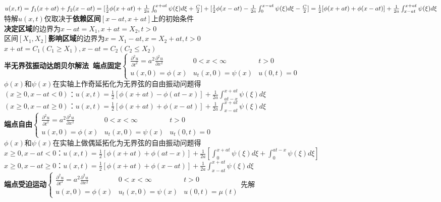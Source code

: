 \documentclass[10pt,a4paper]{article}
\begin{document}
\begin{multicols}{2}
$u(x,t)=f_1(x+at)+f_2(x-at)\\=[\frac{1}{2}\phi(x+at)+\frac{1}{2a}\int_0^{x+at}\psi(\xi)d\xi+\frac{C}{2}]+[\frac{1}{2}\phi(x-at)-\frac{1}{2a}\int_0^{x-at}\psi(\xi)d\xi-\frac{C}{2}]\\=\frac{1}{2}[\phi(x+at)+\phi(x-at)]+\frac{1}{2a}\int_{x-at}^{x+at}\psi(\xi)d\xi$\\
特解$u(x,t)$仅取决于\textbf{依赖区间}$[x-at,x+at]$上的初始条件\\
\textbf{决定区域}的边界为$x-at=X_1,x+at=X_2,t>0$\\
区间$[X_1,X_2]$\textbf{影响区域}的边界为$x=X_1-at,x=X_2+at,t>0$\\
\indent{}$x+at=C_1(C_1\geq X_1),x-at=C_2(C_2\leq X_2)$\scriptsize\\
\textbf{半无界弦振动达朗贝尔解法~端点固定}$\left\{\begin{array}{lll}\frac{\partial^2u}{\partial t^2}=a^2\frac{\partial^2u}{\partial x^2}&0<x<\infty&t>0\\u(x,0)=\phi(x)&u_t(x,0)=\psi(x)&u(0,t)=0\end{array}\right.$\\
$\phi(x)$和$\psi(x)$在实轴上作奇延拓化为无界弦的自由振动问题得\\
$(x\geq0,x-at<0)$：$u(x,t)=\frac{1}{2}[\phi(x+at)-\phi(at-x)]+\frac{1}{2a}\int_{at-x}^{x+at}\psi(\xi)d\xi$\\
$(x\geq0,x-at\geq0)$：$u(x,t)=\frac{1}{2}[\phi(x+at)+\phi(x-at)]+\frac{1}{2a}\int_{x-at}^{x+at}\psi(\xi)d\xi$\\
\indent\textbf{端点自由}$\left\{\begin{array}{lll}\frac{\partial^2u}{\partial t^2}=a^2\frac{\partial^2u}{\partial x^2}&0<x<\infty&t>0\\u(x,0)=\phi(x)&u_t(x,0)=\psi(x)&u_t(0,t)=0\end{array}\right.$\\
$\phi(x)$和$\psi(x)$在实轴上做偶延拓化为无界弦的自由振动问题得\\
$x\geq0,x-at<0$：$u(x,t)=\frac{1}{2}[\phi(x+at)+\phi(at-x)]+\frac{1}{2a}[\int_0^{x+at}\psi(\xi)d\xi+\int_0^{at-x}\psi(\xi)d\xi]$\\
$x\geq0,x-at\geq0$：$u(x,t)=\frac{1}{2}[\phi(x+at)+\phi(x-at)]+\frac{1}{2a}\int_{x-at}^{x+at}\psi(\xi)d\xi$\\
\indent\textbf{端点受迫运动}$\left\{\begin{array}{lll}\frac{\partial^2u}{\partial t^2}=a^2\frac{\partial^2u}{\partial x^2}&0<x<\infty&t>0\\u(x,0)=\phi(x)&u_t(x,0)=\psi(x)&u(0,t)=\mu(t)\end{array}\right.$先解\\

\end{multicols}
\end{document}
